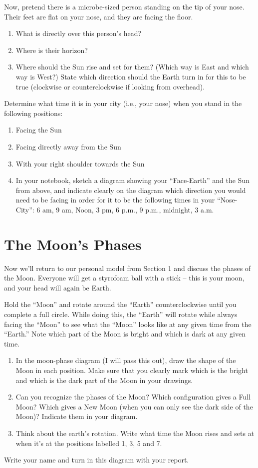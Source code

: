 \documentclass[12pt]{article}%
\begin{document}
Now, pretend there is a microbe-sized person standing on the tip of your nose.  Their feet are flat on your nose, and they are facing the floor.

\begin{enumerate}
    \item What is directly over this person's head?
	\item Where is their horizon? 
	\item Where should the Sun rise and set for them? (Which way is East and which way is West?) State which direction should the Earth turn in for this to be true (clockwise or counterclockwise if looking from overhead).
\end{enumerate}


Determine what time it is in your city (i.e., your nose) when you stand in the following positions:
\begin{enumerate}
	\item Facing the Sun
	\item Facing directly away from the Sun 
	\item With your right shoulder towards the Sun
    \item In your notebook, sketch a diagram showing your ``Face-Earth'' and the Sun from above, and indicate clearly on the diagram which direction you would need to be facing in order for it to be the following times in your ``Nose-City'': 6 am, 9 am, Noon, 3 pm, 6 p.m., 9 p.m., midnight, 3 a.m.  
\end{enumerate}

\section{The Moon's Phases}
Now we'll return to our personal model from Section 1 and discuss the phases of the Moon. Everyone will get a styrofoam ball with a stick -- this is your moon, and your head will again be Earth. 

Hold the ``Moon'' and rotate around the ``Earth'' counterclockwise until you complete a full circle.  While doing this, the ``Earth'' will rotate while always facing the ``Moon'' to see what the ``Moon'' looks like at any given time from the ``Earth.'' Note which part of the Moon is bright and which is dark at any given time. 

\begin{enumerate}
    \item In the moon-phase diagram (I will pass this out), draw the shape of the Moon in each position. Make sure that you clearly mark which is the bright and which is the dark part of the Moon in your drawings. 
    \item Can you recognize the phases of the Moon? Which configuration gives a Full Moon? Which gives a New Moon (when you can only see the dark side of the Moon)? Indicate them in your diagram.
    \item Think about the earth's rotation.  Write what time the Moon rises and sets at when it's at the positions labelled 1, 3, 5 and 7.
\end{enumerate}
Write your name and turn in this diagram with your report.
\end{document}
